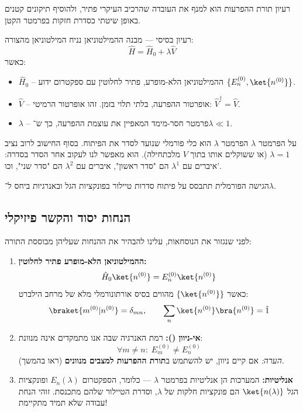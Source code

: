 רעיון תורת ההפרעות הוא למנף את העובדה שהרכיב העיקרי פתיר, ולהוסיף תיקונים קטנים באופן שיטתי כסדרת חזקות בפרמטר הקטן.

\begin{definitionbox}{רעיון בסיסי — מבנה ההמילטוניאן}
נניח המילטוניאן מהצורה:
\[
\hat{H} = \hat{H}_0 + \lambda \hat{V}
\]
כאשר:
\begin{itemize}
\item $\hat{H}_0$ – ההמילטוניאן הלא-מופרע, פתיר לחלוטין עם ספקטרום ידוע $\{E_n^{(0)}, \ket{n^{(0)}}\}$.
\item $\hat{V}$ – אופרטור ההפרעה, בלתי תלוי בזמן. זהו אופרטור הרמיטי: $\hat{V}^\dagger = \hat{V}$.
\item $\lambda$ – פרמטר חסר-מימד המאפיין את עוצמת ההפרעה, כך ש־$\lambda \ll 1$.
\end{itemize}
\end{definitionbox}

\begin{notebox}{על הפרמטר $\lambda$}
הפרמטר $\lambda$ הוא כלי פורמלי שנועד לסדר את הפיתוח. בסוף החישוב לרוב נציב $\lambda = 1$ (או ששוקלים אותו בתוך $V$ מלכתחילה). הוא מאפשר לנו לעקוב אחר הסדר בסדרה: איברים עם $\lambda^1$ הם "סדר ראשון", איברים עם $\lambda^2$ הם "סדר שני", וכו'.
\end{notebox}

הגישה הפורמלית תתבסס על פיתוח סדרות טיילור בפונקציות הגל ובאנרגיות ביחס ל־$\lambda$.


\subsection{הנחות יסוד והקשר פיזיקלי}

לפני שנגזור את הנוסחאות, עלינו להבהיר את ההנחות שעליהן מבוססת התורה:

\begin{enumerate}
\item \textbf{ההמילטוניאן הלא-מופרע פתיר לחלוטין:}
\[
\hat{H}_0\ket{n^{(0)}} = E_n^{(0)}\ket{n^{(0)}}
\]
כאשר $\{\ket{n^{(0)}}\}$ מהווים בסיס אורתונורמלי מלא של מרחב הילברט:
\[
\braket{m^{(0)}|n^{(0)}} = \delta_{mn}, \qquad \sum_n \ket{n^{(0)}}\bra{n^{(0)}} = \hat{1}
\]

\item \textbf{אי-ניוון ():} רמת האנרגיה שבה אנו מתמקדים אינה מנוונת:
\[
\forall m\neq n:\; E_m^{(0)} \neq E_n^{(0)}
\]
\textit{הערה:} אם קיים ניוון, יש להשתמש ב\textbf{תורת ההפרעות למצבים מנוונים} (ראו בהמשך).

\item \textbf{אנליטיות:} המערכות הן אנליטיות בפרמטר $\lambda$ — כלומר, הספקטרום $E_n(\lambda)$ ופונקציות הגל $\ket{n(\lambda)}$ הם פונקציות חלקות של $\lambda$, וסדרת הטיילור שלהם מתכנסת. זוהי הנחת עבודה שלא תמיד מתקיימת!
\end{enumerate}

